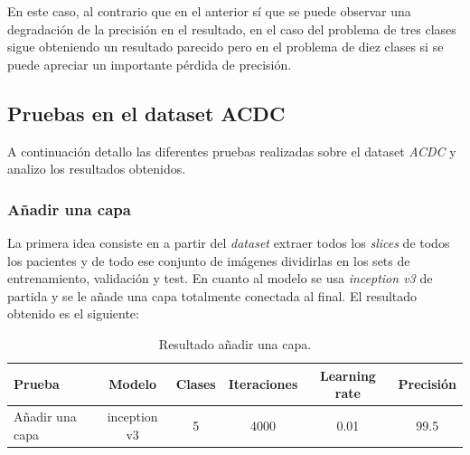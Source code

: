 \documentclass[12pt,a4paper]{article}
\begin{document}
\begin{table}[H]
\centering
{}
\caption{Resultados quitar 3 capas.}
\end{table}

En este caso, al contrario que en el anterior sí que se puede observar una degradación de la precisión en el resultado, en el caso del problema de tres clases sigue obteniendo un resultado parecido pero en el problema de diez clases si se puede apreciar un importante pérdida de precisión.

\subsection{Pruebas en el dataset ACDC}
A continuación detallo las diferentes pruebas realizadas sobre el dataset \textit{ACDC} y analizo los resultados obtenidos.

\subsubsection{Añadir una capa}
La primera idea consiste en a partir del \textit{dataset} extraer todos los \textit{slices} de todos los pacientes y de todo ese conjunto de imágenes dividirlas en los sets de entrenamiento, validación y test. En cuanto al modelo se usa \textit{inception v3} de partida y se le añade una capa totalmente conectada al final. El resultado obtenido es el siguiente:

\begin{table}[H]
\centering
\begin{tabular}{|l|c|c|c|c|c|}
\hline
\textbf{Prueba} & \textbf{Modelo} & \textbf{Clases} & \textbf{Iteraciones} & \textbf{Learning rate} & \textbf{Precisión} \\ \hline
Añadir una capa & inception v3    & 5               & 4000                 & 0.01                   & 99.5               \\ \hline
\end{tabular}
\caption{Resultado añadir una capa.}
\end{table}
\end{document}
